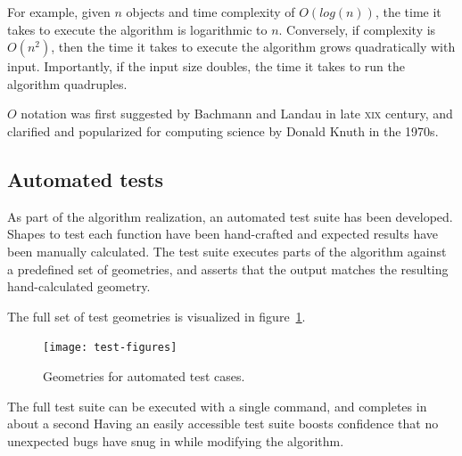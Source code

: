 \documentclass[a4paper]{article}
\begin{document}
\begin{description}
        For example, given $n$ objects and time complexity of $O(log(n))$, the
        time it takes to execute the algorithm is logarithmic to $n$.
        Conversely, if complexity is $O(n^2)$, then the time it takes to
        execute the algorithm grows quadratically with input. Importantly, if
        the input size doubles, the time it takes to run the algorithm
        quadruples.

        $O$ notation was first suggested by
        Bachmann\cite{bachmann1894analytische} and Landau\cite{landau1911} in
        late \textsc{xix} century, and clarified and popularized for
        computing science by Donald Knuth\cite{knuth1976big} in the 1970s.

\end{description}

\subsection{Automated tests}
\label{sec:automated-tests}

As part of the algorithm realization, an automated test suite has been
developed. Shapes to test each function have been hand-crafted and expected
results have been manually calculated. The test suite executes parts of the
algorithm against a predefined set of geometries, and asserts that the output
matches the resulting hand-calculated geometry.

The full set of test geometries is visualized in figure~\ref{fig:test-figures}.

\begin{figure}[ht]
    \centering
    \texttt{[image: test-figures]}
    \caption{Geometries for automated test cases.}
    \label{fig:test-figures}
\end{figure}

The full test suite can be executed with a single command, and completes in
about a second Having an easily accessible test suite boosts confidence that no
unexpected bugs have snug in while modifying the algorithm.
\end{document}
